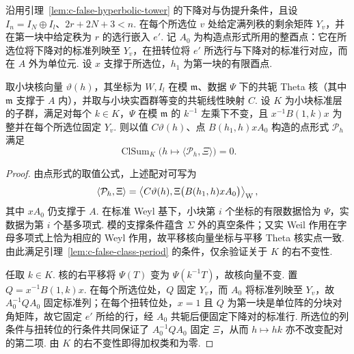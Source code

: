 \begin{lemma}[伪提升与点形式的有限周期消失]
\label{lem:c-false-point-period}
\emitthmsource
沿用引理~\ref{lem:c-false-hyperbolic-tower} 的下降对与伪提升条件，且设 $I_n=I_N\oplus I_l$、$2r+2N+3<n$. 在每个所选位 $v$ 处给定满列秩的剩余矩阵 $Y_v$，并在第一块中给定秩为 $r$ 的选行嵌入 $e'$. 记 $A_0$ 为构造点形式所用的整酉点：它在所选位将下降对的标准列映至 $Y_v$，在扭转位将 $e'$ 所选行与下降对的标准行对应，而在 $A$ 外为单位元. 设 $x$ 支撑于所选位，$h_1$ 为第一块的有限酉点.

取小块核向量 $\vartheta(h)$，其坐标为 $W,I_l$ 在模 $\mathfrak m$、数据 $\Psi$ 下的共轭 Theta 核（其中 $\mathfrak m$ 支撑于 $A$ 内），并取与小块实酉群等变的共轭线性映射 $C$. 设 $K$ 为小块标准层的子群，满足对每个 $k\in K$，$\Psi$ 在模 $\mathfrak m$ 的 $k^{-1}$ 左乘下不变，且 $x^{-1}B(1,k)x$ 为整并在每个所选位固定 $Y_v$. 则以值 $C\vartheta(h)$、点 $B(h_1,h)xA_0$ 构造的点形式 $\mathcal P_h$ 满足
\[
    \operatorname{ClSum}_{K}\bigl(h\mapsto
             \langle\mathcal P_h,\Xi\rangle\bigr)=0 .
\]
\end{lemma}

\begin{proof}
由点形式的取值公式，上述配对可写为
\[
 \langle\mathcal P_h,\Xi\rangle=
 \left\langle C\vartheta(h),\Xi\bigl(B(h_1,h)xA_0\bigr)\right\rangle_{\rm W},
\]
其中 $xA_0$ 仍支撑于 $A$. 在标准 Weyl 基下，小块第 $i$ 个坐标的有限数据恰为 $\Psi$，实数据为第 $i$ 个基多项式. 模的支撑条件蕴含 $\Sigma$ 外的真空条件；又实 Weil 作用在字母多项式上恰为相应的 Weyl 作用，故平移核向量坐标与平移 Theta 核实点一致. 由此满足引理~\ref{lem:c-false-class-period} 的条件，仅余验证关于 $K$ 的右不变性.

任取 $k\in K$. 核的右平移将 $\Psi(T)$ 变为 $\Psi(k^{-1}T)$，故核向量不变. 置 $Q=x^{-1}B(1,k)x$. 在每个所选位处，$Q$ 固定 $Y_v$，而 $A_0$ 将标准列映至 $Y_v$，故 $A_0^{-1}QA_0$ 固定标准列；在每个扭转位处，$x=1$ 且 $Q$ 为第一块是单位阵的分块对角矩阵，故它固定 $e'$ 所给的行，经 $A_0$ 共轭后便固定下降对的标准行. 所选位的列条件与扭转位的行条件共同保证了 $A_0^{-1}QA_0$ 固定 $\Xi$，从而 $h\mapsto hk$ 亦不改变配对的第二项. 由 $K$ 的右不变性即得加权类和为零.
\end{proof}

